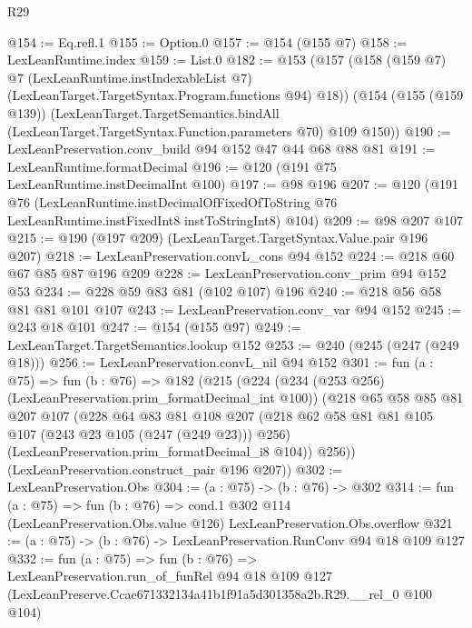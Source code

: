 \begin{lexlean}{R29}
\begin{coremodule}
@154 := Eq.refl.{1}
@155 := Option.{0}
@157 := @154 (@155 @7)
@158 := LexLeanRuntime.index
@159 := List.{0}
@182 := @153
    (@157
      (@158
        (@159 @7)
        @7
        (LexLeanRuntime.instIndexableList @7)
        (LexLeanTarget.TargetSyntax.Program.functions @94)
        @18))
    (@154
      (@155 (@159 @139))
      (LexLeanTarget.TargetSemantics.bindAll
        (LexLeanTarget.TargetSyntax.Function.parameters @70)
        @109
        @150))
@190 := LexLeanPreservation.conv_build @94 @152 @47 @44 @68 @88 @81
@191 := LexLeanRuntime.formatDecimal
@196 := @120 (@191 @75 LexLeanRuntime.instDecimalInt @100)
@197 := @98 @196
@207 := @120
    (@191
      @76
      (LexLeanRuntime.instDecimalOfFixedOfToString
        @76
        LexLeanRuntime.instFixedInt8
        instToStringInt8)
      @104)
@209 := @98 @207 @107
@215 := @190 (@197 @209) (LexLeanTarget.TargetSyntax.Value.pair @196 @207)
@218 := LexLeanPreservation.convL_cons @94 @152
@224 := @218 @60 @67 @85 @87 @196 @209
@228 := LexLeanPreservation.conv_prim @94 @152 @53
@234 := @228 @59 @83 @81 (@102 @107) @196
@240 := @218 @56 @58 @81 @81 @101 @107
@243 := LexLeanPreservation.conv_var @94 @152
@245 := @243 @18 @101
@247 := @154 (@155 @97)
@249 := LexLeanTarget.TargetSemantics.lookup @152
@253 := @240 (@245 (@247 (@249 @18)))
@256 := LexLeanPreservation.convL_nil @94 @152
@301 := fun (a : @75) =>
  fun (b : @76) =>
  @182
    (@215
      (@224
        (@234 (@253 @256) (LexLeanPreservation.prim_formatDecimal_int @100))
        (@218
          @65
          @58
          @85
          @81
          @207
          @107
          (@228
            @64
            @83
            @81
            @108
            @207
            (@218 @62 @58 @81 @81 @105 @107 (@243 @23 @105 (@247 (@249 @23))) @256)
            (LexLeanPreservation.prim_formatDecimal_i8 @104))
          @256))
      (LexLeanPreservation.construct_pair @196 @207))
@302 := LexLeanPreservation.Obs
@304 := (a : @75) -> (b : @76) -> @302
@314 := fun (a : @75) =>
  fun (b : @76) =>
  cond.{1} @302 @114 (LexLeanPreservation.Obs.value @126) LexLeanPreservation.Obs.overflow
@321 := (a : @75) -> (b : @76) -> LexLeanPreservation.RunConv @94 @18 @109 @127
@332 := fun (a : @75) =>
  fun (b : @76) =>
  LexLeanPreservation.run_of_funRel
    @94
    @18
    @109
    @127
    (LexLeanPreserve.Ccae671332134a41b1f91a5d301358a2b.R29.__rel_0 @100 @104)
\end{coremodule}
\end{lexlean}
